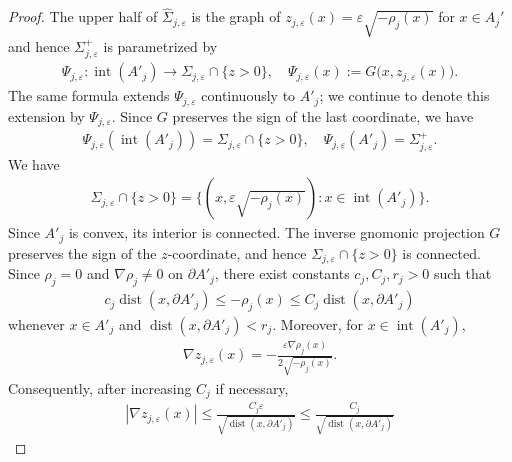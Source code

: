 \documentclass[11pt,reqno]{amsart}
\numberwithin{equation}{section}
\theoremstyle{definition}
\theoremstyle{remark}
\newcommand{\dist}{\operatorname{dist}}
\newcommand{\0}{\emptyset}
\begin{document}
\begin{proof}
The upper half of $\widehat\Sigma_{j,\varepsilon}$ is the graph of $ z_{j,\varepsilon}(x)= \varepsilon\sqrt{-\rho_j(x)}$ for $x\in A_j'$ and hence $\Sigma_{j,\varepsilon}^+$ is parametrized by
\begin{align}
        \Psi_{j,\varepsilon}:\operatorname{int}(A'_j)
        \rightarrow
        \Sigma_{j,\varepsilon}\cap\{z>0\},
        \quad 
        \Psi_{j,\varepsilon}(x)
        :=
        G\bigl(x,z_{j,\varepsilon}(x)\bigr).
\end{align}
The same formula extends $\Psi_{j,\varepsilon}$ continuously to $A'_j$;
we continue to denote this extension by $\Psi_{j,\varepsilon}$. Since
$G$ preserves the sign of the last coordinate, we have
\begin{align}
        \Psi_{j,\varepsilon}
        \left(
        \operatorname{int}(A'_j)
        \right)
        =
        \Sigma_{j,\varepsilon}\cap\{z>0\},
        \quad
        \Psi_{j,\varepsilon}(A'_j)
        =
        \Sigma_{j,\varepsilon}^+.
\end{align}
 We have
\begin{align}
        \widehat\Sigma_{j,\varepsilon}\cap\{z>0\}
        =
        \{
        (x,\varepsilon\sqrt{-\rho_j(x)}):
        x\in\operatorname{int}(A'_j)
        \}.
\end{align}
Since $A'_j$ is convex, its interior is connected. The inverse gnomonic
projection $G$ preserves the sign of the $z$-coordinate, and hence
$\Sigma_{j,\varepsilon}\cap\{z>0\}$ is connected. Since $\rho_j=0$ and $\nabla\rho_j\neq0$ on $\partial A'_j$, there exist
constants $c_j,C_j,r_j>0$ such that
\begin{align}\label{eq:hemisphere-pancake-defining-function-distance}
        c_j\dist(x,\partial A'_j)
        \leq
        -\rho_j(x)
        \leq
        C_j\dist(x,\partial A'_j)
\end{align}
whenever $x\in A'_j$ and
$\dist(x,\partial A'_j)<r_j$. Moreover,
for $x\in\operatorname{int}(A'_j)$,
\begin{align}
        \nabla z_{j,\varepsilon}(x)
        =
        -\frac{\varepsilon\nabla\rho_j(x)}
        {2\sqrt{-\rho_j(x)}}.
\end{align}
Consequently, after increasing $C_j$ if necessary,
\begin{align}\label{eq:hemisphere-pancake-graph-gradient-bound}
        |\nabla z_{j,\varepsilon}(x)|
        \leq
        \frac{C_j\varepsilon}
        {\sqrt{\dist(x,\partial A'_j)}}
        \leq
        \frac{C_j}
        {\sqrt{\dist(x,\partial A'_j)}}
\end{align}

\end{proof}
\end{document}
